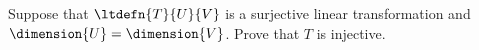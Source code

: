 Suppose that $\ltdefn{T}{U}{V}$ is a surjective linear transformation and $\dimension{U}=\dimension{V}$.  Prove that $T$ is injective.